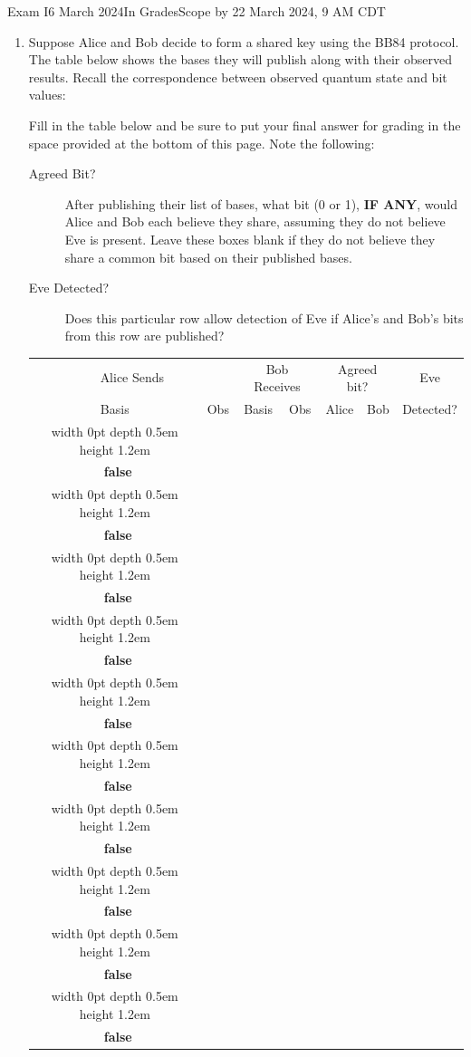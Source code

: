 \documentclass[12pt]{article}
\def\Gate#1{\mbox{\textbf{#1}}}
\def\Y{\Gate{Y}}
\def\Z{\Gate{Z}}
\def\H{\Gate{H}}
\def\Obox#1{\Ovalbox{\hbox to 1ex{\vrule width 0pt height 1ex\hss #1\hss}}}
\def\TFMarked#1#2{\ \stackbox[l][m]{\Obox{#1}~\textbf{true}\\\Obox{#2}~\textbf{false}}}
\def\TF{\TFMarked{\relax}{\relax}}
\newcommand{\Blank}[1][1in]{\mbox{\vrule width #1 depth 2pt}\vrule width 0pt height 2.0em}
\def\BlQb{\mbox{\ensuremath{\Blank[4em]\ket{0}+\Blank[4em]\ket{1}}}}
\begin{document}
\begin{assignment}{Exam I}{6 March 2024}{In GradesScope by 22 March 2024, 9 AM CDT}
\begin{enumerate}
\begin{itemize}
    \item We begin at the North pole of the Bloch sphere.
    \item We are in state \BlQb{}.
    \item We rotate about the \Z{} axis $\pi/4$ radians.  We are now at \BlQb{}.
    \item \vline height 2em width0pt We begin again at the North pole.
    \item We experience a \Y{} gate.  We are now at \BlQb{}.
    \item We then experience a \Z{} gate.  We are now at state \BlQb{}.
    \item We finally experience an \H{} gate.  We are now at state \BlQb{}.
\end{itemize}
\LeaveSpace{1in}
\item{}  Suppose Alice and Bob decide to form a shared key using the BB84 protocol.  The table below shows the bases they will publish along with their observed results.   Recall the correspondence between observed quantum state and bit values:
\begin{BBKey}
\begin{center}
\BBBasis{}
\end{center}
\end{BBKey}
\def\RowU#1#2#3#4{%
\vrule width 0pt depth 0.5em height 1.2em#1 &#2 & #3 & #4 & & & {\vrule width 0pt depth 13pt\small\TF{}}  \\ \hline}
\def\Row#1#2#3{%
\RowU{\STD}{#1}{#2}{#3}}
\def\RowX#1#2#3{%
\RowU{\HDM}{#1}{#2}{#3}}
\Continued{}
Fill in the table below and be sure to put your final answer for grading in the space provided at the bottom of this page.  Note the following:
\begin{description}
  \item[Agreed Bit?]  After publishing their list of bases, what bit (0 or 1), \textbf{IF ANY}, would Alice and Bob each believe they share, assuming they do not believe Eve is present. Leave these boxes blank if they do not believe they share a common bit based on their published bases.
  \item[Eve Detected?] Does this particular row allow detection of Eve if Alice's and Bob's bits from this row are published?
\end{description}

\begin{BBKey}
\begin{center}\Large
\begin{tabular}{c|c||c|c||c|c||c}
\multicolumn{2}{c||}{Alice Sends} & \multicolumn{2}{c||}{Bob Receives}& \multicolumn{2}{c||}{Agreed bit?}&Eve \\
Basis & Obs & Basis & Obs & Alice & Bob & Detected?\\\hline
\RowX{\BBNe}{\HDM}{\BBNe}
\Row{\BBUp}{\STD}{\BBUp}
\RowX{\BBNe}{\HDM}{\BBSe}
\Row{\BBRt}{\STD}{\BBRt}
\Row{\BBUp}{\HDM}{\BBNe}
\Row{\BBUp}{\STD}{\BBUp}\Row{\BBRt}{\HDM}{\BBSe}
\RowX{\BBSe}{\HDM}{\BBSe}
\Row{\BBRt}{\STD}{\BBUp}
\RowX{\BBNe}{\HDM}{\BBNe}


\end{tabular}
\end{center}
\end{BBKey}
\end{enumerate}
\end{assignment}
\end{document}
